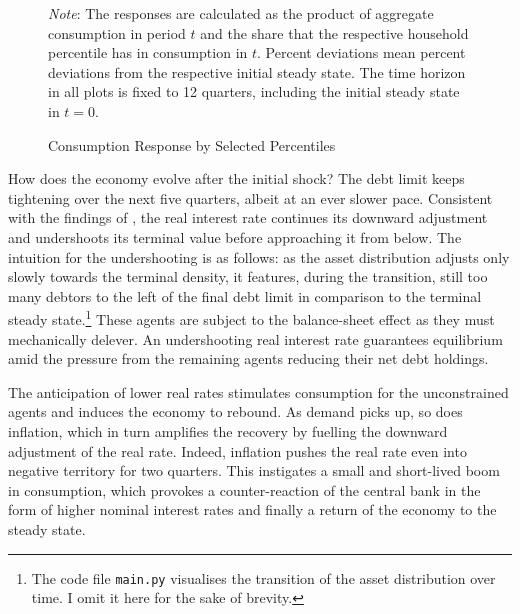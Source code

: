 \documentclass[12pt]{article} %
\numberwithin{equation}{section} %
\numberwithin{figure}{section}
\numberwithin{table}{section}
\begin{document}
\begin{figure}[ht]
    \centering
    \caption{Consumption Response by Selected Percentiles}
    \label{fig:baseline-permanent-limit-dist-c-response}
    

    \vspace{10pt}
    
    \begin{minipage}{0.75\textwidth} 
    \footnotesize
    \textit{Note}: The responses are calculated as the product of aggregate consumption in period $t$ and the share that the respective household percentile has in consumption in $t$. Percent deviations mean percent deviations from the respective initial steady state. The time horizon in all plots is fixed to 12 quarters, including the initial steady state in $t=0$.
    \end{minipage}
\end{figure}

How does the economy evolve after the initial shock? The debt limit keeps tightening over the next five quarters, albeit at an ever slower pace. Consistent with the findings of \textcite{gl2017}, the real interest rate continues its downward adjustment and undershoots its terminal value before approaching it from below. The intuition for the undershooting is as follows: as the asset distribution adjusts only slowly towards the terminal density, it features, during the transition, still too many debtors to the left of the final debt limit in comparison to the terminal steady state.\footnote{The code file \texttt{main.py} visualises the transition of the asset distribution over time. I omit it here for the sake of brevity.} These agents are subject to the balance-sheet effect as they must mechanically delever. An undershooting real interest rate guarantees equilibrium amid the pressure from the remaining agents reducing their net debt holdings.

The anticipation of lower real rates stimulates consumption for the unconstrained agents and induces the economy to rebound. As demand picks up, so does inflation, which in turn amplifies the recovery by fuelling the downward adjustment of the real rate. Indeed, inflation pushes the real rate even into negative territory for two quarters. This instigates a small and short-lived boom in consumption, which provokes a counter-reaction of the central bank in the form of higher nominal interest rates and finally a return of the economy to the steady state.
\end{document}
